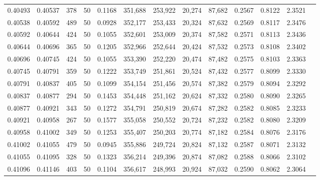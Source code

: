 \begin{tabular}{rrrrrrrrrrrrr}
0.40493 & 0.40537 &   378 &  50 &                                     0.1168 & 351,688 & 253,922 &  20,274 &  87,682 & 0.2567 & 0.8122 & 2.3521 \\
0.40538 & 0.40592 &   489 &  50 &                                     0.0928 & 352,177 & 253,433 &  20,324 &  87,632 & 0.2569 & 0.8117 & 2.3476 \\
0.40592 & 0.40644 &   424 &  50 &                                     0.1055 & 352,601 & 253,009 &  20,374 &  87,582 & 0.2571 & 0.8113 & 2.3436 \\
0.40644 & 0.40696 &   365 &  50 &                                     0.1205 & 352,966 & 252,644 &  20,424 &  87,532 & 0.2573 & 0.8108 & 2.3402 \\
0.40696 & 0.40745 &   424 &  50 &                                     0.1055 & 353,390 & 252,220 &  20,474 &  87,482 & 0.2575 & 0.8103 & 2.3363 \\
0.40745 & 0.40791 &   359 &  50 &                                     0.1222 & 353,749 & 251,861 &  20,524 &  87,432 & 0.2577 & 0.8099 & 2.3330 \\
0.40791 & 0.40837 &   405 &  50 &                                     0.1099 & 354,154 & 251,456 &  20,574 &  87,382 & 0.2579 & 0.8094 & 2.3292 \\
0.40837 & 0.40877 &   294 &  50 &                                     0.1453 & 354,448 & 251,162 &  20,624 &  87,332 & 0.2580 & 0.8090 & 2.3265 \\
0.40877 & 0.40921 &   343 &  50 &                                     0.1272 & 354,791 & 250,819 &  20,674 &  87,282 & 0.2582 & 0.8085 & 2.3233 \\
0.40921 & 0.40958 &   267 &  50 &                                     0.1577 & 355,058 & 250,552 &  20,724 &  87,232 & 0.2582 & 0.8080 & 2.3209 \\
0.40958 & 0.41002 &   349 &  50 &                                     0.1253 & 355,407 & 250,203 &  20,774 &  87,182 & 0.2584 & 0.8076 & 2.3176 \\
0.41002 & 0.41055 &   479 &  50 &                                     0.0945 & 355,886 & 249,724 &  20,824 &  87,132 & 0.2587 & 0.8071 & 2.3132 \\
0.41055 & 0.41095 &   328 &  50 &                                     0.1323 & 356,214 & 249,396 &  20,874 &  87,082 & 0.2588 & 0.8066 & 2.3102 \\
0.41096 & 0.41146 &   403 &  50 &                                     0.1104 & 356,617 & 248,993 &  20,924 &  87,032 & 0.2590 & 0.8062 & 2.3064 \\

\end{tabular}
